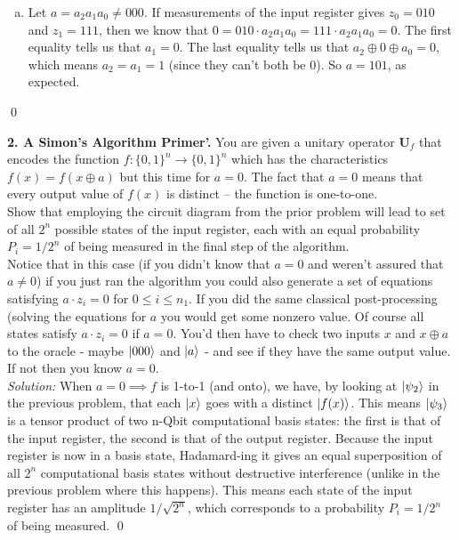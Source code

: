 \documentclass{book}
\theoremstyle{definition}
\newcommand{\U}{\mathbf{U}}
\begin{document}
\begin{enumerate}[(a)]
	

	\item Let $a = a_2a_1a_0 \neq 000$. If measurements of the input register gives $z_0 = 010$ and $z_1 = 111$, then we know that $0= 010 \cdot a_2 a_1 a_0 = 111 \cdot a_2 a_1 a_0 = 0$. The first equality tells us that $a_1 = 0$. The last equality tells us that $a_2 \oplus 0 \oplus a_0 = 0$, which means $a_2 = a_1 = 1$ (since they can't both be 0). So $a = 101$, as expected. 
	
	
	
	
	
	
\end{enumerate}\qed






\newpage









\noindent \textbf{2. A Simon's Algorithm Primer'.} You are given a unitary operator $\U_f$ that encodes the function $f : \{0,1\}^n \to \{0,1\}^n$ which has the characteristics $f(x) = f(x\oplus a)$ but this time for $a=0$. The fact that $a = 0$ means that every output value of $f(x)$ is distinct -- the function is one-to-one.	\\

Show that employing the circuit diagram from the prior problem will lead to set of all $2^n$ possible states of the input register, each with an equal probability $P_i = 1/2^n$ of being measured in the final step of the algorithm.\\

Notice that in this case (if you didn’t know that $a = 0$ and weren't assured that $a \neq 0$) if
you just ran the algorithm you could also generate a set of equations satisfying $a \cdot z_i = 0$ for
$0 \leq i \leq n_1$. If you did the same classical post-processing (solving the equations for $a$ you
would get some nonzero value. Of course all states satisfy $a \cdot z_i = 0$ if $a = 0$. You'd then have
to check two inputs $x$ and $x \oplus a$ to the oracle - maybe $\ket{000}$ and $\ket{a}$ - and see if they have the
same output value. If not then you know $a = 0$.
\\


\noindent \textit{Solution:} When $a = 0 \implies f$ is 1-to-1 (and onto), we have, by looking at $\ket{\psi_2}$ in the previous problem, that each $\ket{x}$ goes with a distinct $\ket{f(x)}$. This means $\ket{\psi_3}$ is a tensor product of two n-Qbit computational basis states: the first is that of the input register, the second is that of the output register.  Because the input register is now in a basis state, Hadamard-ing it gives an equal superposition of all $2^n$ computational basis states without destructive interference (unlike in the previous problem where this happens). This means each state of the input register has an amplitude $1/\sqrt{2^n}$, which corresponds to a probability $P_i = 1/2^n$ of being measured. \qed
\end{document}
